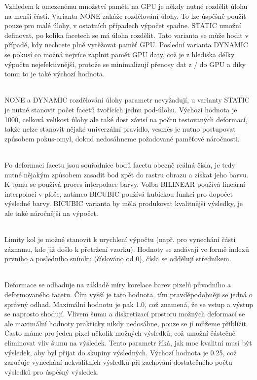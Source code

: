 \documentclass[a4paper,12pt]{article}
\begin{document}
\begin{description}
Vzhledem k omezenému množství paměti na GPU je někdy nutné rozdělit úlohu na menší části. Varianta NONE zakáže rozdělování úlohy. To lze úspěšně použít pouze pro malé úlohy, v ostatních případech výpočet spadne. STATIC umožní definovat, po kolika facetech se má úloha rozdělit. Tato varianta se může hodit v případě, kdy nechcete plně vytěžovat paměť GPU. Poslední varianta DYNAMIC se pokusí co možná nejvíce zaplnit paměť GPU daty, což je z hlediska délky výpočtu nejefektivnější, protože se minimalizují přenosy dat z / do GPU a díky tomu to je také výchozí hodnota.
\item[TASK\textunderscore SPLIT\textunderscore PARAM] [int]\\
NONE a DYNAMIC rozdělování úlohy parametr nevyžadují, u varianty STATIC je nutné stanovit počet facetů tvořících jednu pod-úlohu. Výchozí hodnota je 1000, celková velikost úlohy ale také dost závisí na počtu testovaných deformací, takže nelze stanovit nějaké univerzální pravidlo, vesměs je nutno postupovat způsobem pokus-omyl, dokud nedosáhneme požadované paměťové náročnosti.
\item[INTERPOLATION] [BILINEAR | \textbf{BICUBIC}]\\
Po deformaci facetu jsou souřadnice bodů facetu obecně reálná čísla, je tedy nutné nějakým způsobem zasadit bod zpět do rastru obrazu a získat jeho barvu. K tomu se používá proces interpolace barvy. Volba BILINEAR používá lineární interpolaci v ploše, zatímco BICUBIC používá kubickou funkci pro dopočet výsledné barvy. BICUBIC varianta by měla produkovat kvalitnější výsledky, je ale také náročnější na výpočet.
\item[ROUND\textunderscore LIMITS] [int ; int]\\
Limity kol je možné stanovit k urychlení výpočtu (např. pro vynechání části záznamu, kde již došlo k přetržení vzorku). Hodnoty se zadávají ve formě indexů prvního a posledního snímku (číslováno od 0), čísla se oddělují středníkem.
\item[RESULT\textunderscore QUALITY] [double]\\
Deformace se odhaduje na základě míry korelace barev pixelů původního a deformovaného facetu. Čím vyšší je tato hodnota, tím pravděpodobněji se jedná o správný odhad. Maximální hodnotu je pak 1.0, což znamená, že se vstup a výstup se naprosto shodují. Vlivem šumu a diskretizací prostoru možných deformací se ale maximální hodnoty prakticky nikdy nedosáhne, pouze se jí můžeme přiblížit. Často máme pro jeden pixel několik možných výsledků, což umožní částečně eliminovat vliv šumu na výsledek. Tento parametr říká, jak moc kvalitní musí být výsledek, aby byl přijat do skupiny výsledných. Výchozí hodnota je 0.25, což zaručuje vynechání nekvalitních výsledků při zachování dostatečného počtu výsledků pro úspěšný výsledek. 

\end{description}
\end{document}

